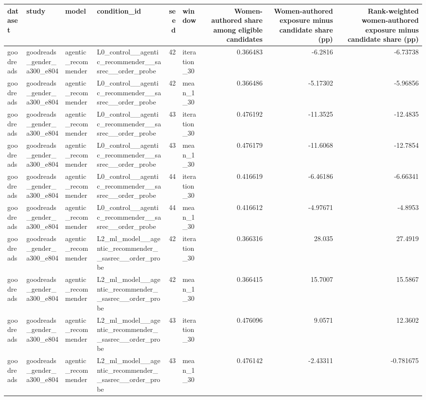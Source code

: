 \begin{table}[htbp!]
\centering
\small
\setlength{\tabcolsep}{3pt}
\renewcommand{\arraystretch}{1.1}
\begin{tabular}{llllrlrrr}
\hline
dataset & study & model & condition\_id & seed & window & Women-authored share among eligible candidates & Women-authored exposure minus candidate share (pp) & Rank-weighted women-authored exposure minus candidate share (pp) \\
\hline
goodreads & goodreads\_gender\_a300\_e804 & agentic\_recommender & L0\_control\_\_agentic\_recommender\_\_sasrec\_\_order\_probe & 42 & iteration\_30 & 0.366483 & -6.2816 & -6.73738 \\
goodreads & goodreads\_gender\_a300\_e804 & agentic\_recommender & L0\_control\_\_agentic\_recommender\_\_sasrec\_\_order\_probe & 42 & mean\_1\_30 & 0.366486 & -5.17302 & -5.96856 \\
goodreads & goodreads\_gender\_a300\_e804 & agentic\_recommender & L0\_control\_\_agentic\_recommender\_\_sasrec\_\_order\_probe & 43 & iteration\_30 & 0.476192 & -11.3525 & -12.4835 \\
goodreads & goodreads\_gender\_a300\_e804 & agentic\_recommender & L0\_control\_\_agentic\_recommender\_\_sasrec\_\_order\_probe & 43 & mean\_1\_30 & 0.476179 & -11.6068 & -12.7854 \\
goodreads & goodreads\_gender\_a300\_e804 & agentic\_recommender & L0\_control\_\_agentic\_recommender\_\_sasrec\_\_order\_probe & 44 & iteration\_30 & 0.416619 & -6.46186 & -6.66341 \\
goodreads & goodreads\_gender\_a300\_e804 & agentic\_recommender & L0\_control\_\_agentic\_recommender\_\_sasrec\_\_order\_probe & 44 & mean\_1\_30 & 0.416612 & -4.97671 & -4.8953 \\
goodreads & goodreads\_gender\_a300\_e804 & agentic\_recommender & L2\_ml\_model\_\_agentic\_recommender\_\_sasrec\_\_order\_probe & 42 & iteration\_30 & 0.366316 & 28.035 & 27.4919 \\
goodreads & goodreads\_gender\_a300\_e804 & agentic\_recommender & L2\_ml\_model\_\_agentic\_recommender\_\_sasrec\_\_order\_probe & 42 & mean\_1\_30 & 0.366415 & 15.7007 & 15.5867 \\
goodreads & goodreads\_gender\_a300\_e804 & agentic\_recommender & L2\_ml\_model\_\_agentic\_recommender\_\_sasrec\_\_order\_probe & 43 & iteration\_30 & 0.476096 & 9.0571 & 12.3602 \\
goodreads & goodreads\_gender\_a300\_e804 & agentic\_recommender & L2\_ml\_model\_\_agentic\_recommender\_\_sasrec\_\_order\_probe & 43 & mean\_1\_30 & 0.476142 & -2.43311 & -0.781675 \\

\end{tabular}
\end{table}
